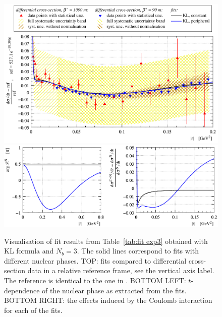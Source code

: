 \begin{figure}
\begin{center}
\includegraphics{fig/fit_exp3/t_dist_rel_with_fit.pdf}
\includegraphics{fig/fit_exp3/phase_cni_effect.pdf}
\caption{Visualisation of fit results from Table~\ref{tab:fit exp3} obtained with KL formula and $N_b=3$. The solid lines correspond to fits with different nuclear phases.
TOP: fits compared to differential cross-section data in a relative reference frame, see the vertical axis label. The reference is identical to the one in \cite{8tev-90m}. 
BOTTOM LEFT: $t$-dependence of the nuclear phase as extracted from the fits.
BOTTOM RIGHT: the effects induced by the Coulomb interaction for each of the fits.
}%
\label{fig:fit exp3}
\end{center}
\end{figure}


